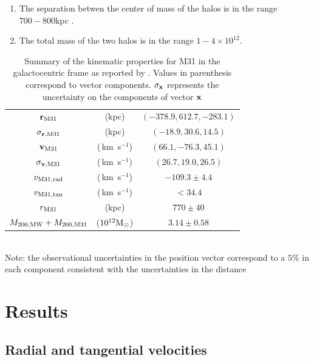 \documentclass{emulateapj}
\newcommand{\kms}{\,km~s$^{-1}$}
\newcommand{\Msun}{{\ifmmode{{\rm {M_{\odot}}}}\else{${\rm{M_{\odot}}}$}\fi}}
\begin{document}
\begin{enumerate}
\item The separation betwen the center of mass of the halos is in the range $700-800$kpc \citep{ribas05,vanderMarel08}.
\item The total mass of the two halos is in the range $1-4\times 10^{12}$\Msun \citep{vanderMarel12}.
\end{enumerate}



\begin{table}
\caption{Summary of the kinematic properties for M31 in the galactocentric frame as reported by \citep{vanderMarel12}. Values in parenthesis correspond to vector components. $\sigma_{\bf x}$ represents the uncertainty on the components of vector ${\bf x}$}
\begin{center}
\begin{tabular}{ccc}\hline\hline
${\bf r}_{\rm M31}$ & (kpc) &$(-378.9, 612.7, -283.1)$\\
$\sigma_{{\bf r}, {\rm M31}}$ & (kpc) &$(-18.9, 30.6, 14.5)$\\
${\bf v}_{\rm M31}$ & (\kms) & $(66.1, -76.3, 45.1)$\\
$\sigma_{{\bf v},{\rm M31}}$ & (\kms) &$(26.7, 19.0, 26.5)$\\
$v_{\rm M31,rad}$ &(\kms) & $-109.3\pm 4.4$\\
$v_{\rm M31,tan}$ &(\kms) & $<34.4$\\
$r_{\rm M31}$ &(kpc) & $770\pm 40$\\
$M_{\rm 200,MW} + M_{\rm 200, M31}$ & ($10^{12}\Msun$) & $3.14\pm 0.58$\\\hline
\end{tabular}\\
\vspace{1mm}
Note: the observational uncertainties in the position vector correspond to a $5\%$ in each component consistent with the uncertainties in the distance \citep[see references in][]{vanderMarel08}
\end{center}
\label{table:1}
\end{table}



\section{Results}
\label{sec:results}




\subsection{Radial and tangential velocities}
\end{document}
